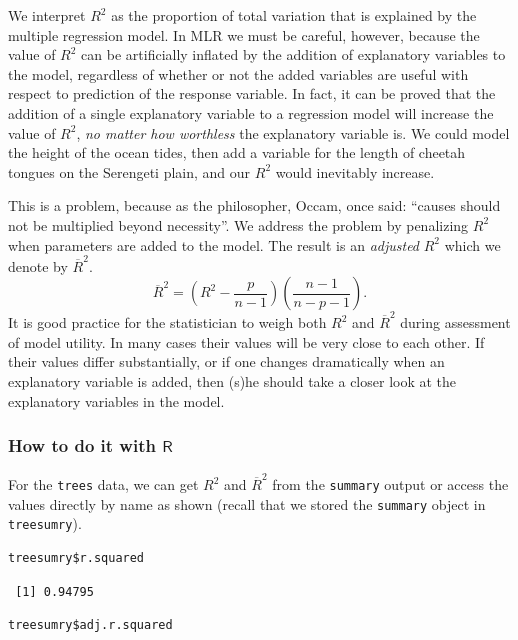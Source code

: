 \documentclass[captions=tableheading]{scrbook}
\begin{document}
We interpret \(R^{2}\) as the proportion of total variation that is explained by the multiple regression model. In MLR we must be careful, however, because the value of \(R^{2}\) can be artificially inflated by the addition of explanatory variables to the model, regardless of whether or not the added variables are useful with respect to prediction of the response variable. In fact, it can be proved that the addition of a single explanatory variable to a regression model will increase the value of \(R^{2}\), \emph{no matter how worthless} the explanatory variable is. We could model the height of the ocean tides, then add a variable for the length of cheetah tongues on the Serengeti plain, and our \(R^{2}\) would inevitably increase. 

This is a problem, because as the philosopher, Occam, once said: ``causes should not be multiplied beyond necessity''. We address the problem by penalizing \(R^{2}\) when parameters are added to the model. The result is an \emph{adjusted} \(R^{2}\) which we denote by \(\overline{R}^{2}\).
\begin{equation}
\overline{R}^{2}=\left(R^{2}-\frac{p}{n-1}\right)\left(\frac{n-1}{n-p-1}\right).
\end{equation}
It is good practice for the statistician to weigh both \(R^{2}\) and \(\overline{R}^{2}\) during assessment of model utility. In many cases their values will be very close to each other. If their values differ substantially, or if one changes dramatically when an explanatory variable is added, then (s)he should take a closer look at the explanatory variables in the model.
\subsubsection{How to do it with \(\mathsf{R}\)}
\label{sec-12-3-1-1}

For the \texttt{trees} data, we can get \(R^{2}\) and \(\overline{R}^{2}\) from the \texttt{summary} output or access the values directly by name as shown (recall that we stored the \texttt{summary} object in \texttt{treesumry}).


\lstset{language=R}
\begin{lstlisting}
treesumry$r.squared
\end{lstlisting}

\begin{verbatim}
 [1] 0.94795
\end{verbatim}


\lstset{language=R}
\begin{lstlisting}
treesumry$adj.r.squared
\end{lstlisting}
\end{document}
